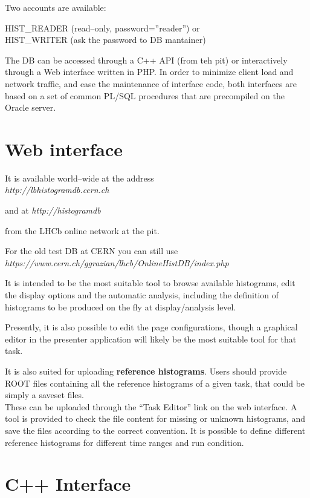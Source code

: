 \documentclass{lhcbnote}
\begin{document}
Two accounts are available:

{HIST\_READER}   (read--only, password=''reader'') or \\
{HIST\_WRITER}  (ask the password to DB mantainer)

The DB can be accessed through a C++ API (from teh pit) or interactively through a
Web interface written in PHP. In order to minimize client load and
network traffic, and ease the maintenance of interface code, both
interfaces  are based on a set of common PL/SQL procedures that are
precompiled on the Oracle server.

\section{Web interface}

It is available world--wide at the address\\
{\it http://lbhistogramdb.cern.ch }

and at 
{\it http://histogramdb}

from the LHCb online network at the pit.

{ \small For the old test DB at CERN you can still use\\
{\it https://www.cern.ch/ggrazian/lhcb/OnlineHistDB/index.php}}


It is intended to be the most suitable tool to browse available
histograms, edit the display options and the automatic analysis, including
the definition of histograms to be produced on the fly at display/analysis level.

Presently, it is also possible to edit the page configurations, though
a graphical editor in the presenter application will likely be the
most suitable tool for that task.

It is also suited for uploading {\bf reference histograms}. Users should
provide ROOT files containing all the reference histograms of a given
task, that could be simply a saveset files. \\
These can be uploaded through the ``Task Editor'' link on the web interface.
A tool is provided to check the file content for missing or unknown histograms,
and save the files according to the correct convention. It is possible to define
different reference histograms for different time ranges and run condition.


\section{C++ Interface}
\end{document}
